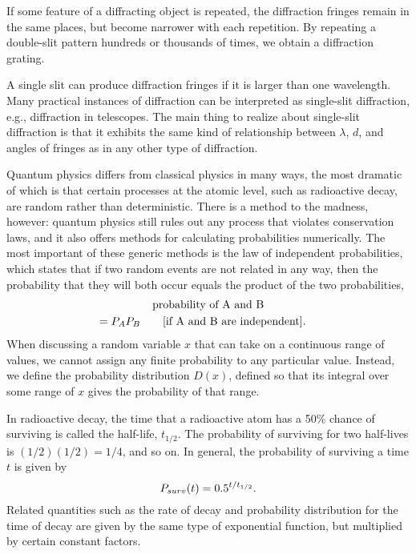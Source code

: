 If some feature of a diffracting object is repeated, the
diffraction fringes remain in the same places, but become
narrower with each repetition. By repeating a double-slit
pattern hundreds or thousands of times, we obtain a
diffraction grating.

A single slit can produce diffraction fringes if it is
larger than one wavelength. Many practical instances of
diffraction can be interpreted as single-slit diffraction,
e.g., diffraction in telescopes. The main thing to realize
about single-slit diffraction is that it exhibits the same
kind of relationship between $\lambda$, $d$, and angles of
fringes as in any other type of diffraction.

Quantum physics differs from classical physics in many ways,
the most dramatic of which is that certain processes at the
atomic level, such as radioactive decay, are random rather
than deterministic. There is a method to the madness,
however: quantum physics still rules out any process that
violates conservation laws, and it also offers methods for
calculating probabilities numerically.
The most important of these generic methods
is the law of independent probabilities, which states that
if two random events are not related in any way, then the
probability that they will both occur equals the product of
the two probabilities,
\begin{multline*}
        \text{probability of A and B}  \\=  P_AP_B  \qquad \shoveright{\text{[if A and B are independent]}\eqquad.}
\end{multline*}
When discussing a random variable $x$ that can take on a continuous
range of values, we cannot assign any finite probability to
any particular value. Instead, we define the probability distribution
$D(x)$, defined so that its integral over some range of $x$ gives
the probability of that range.

In radioactive decay, the
time that a radioactive atom has a 50\% chance of surviving
is called the half-life, $t_{1/2}$. The probability of surviving
for two half-lives is $(1/2)(1/2)=1/4$, and so on. In
general, the probability of surviving a time $t$ is given by
\begin{equation*}
		P_{surv}(t)  =    0.5^{t/t_{1/2}}.
\end{equation*}
Related quantities such as the rate of decay and probability
distribution for the time of decay are given by the same
type of exponential function, but multiplied by certain constant factors.


